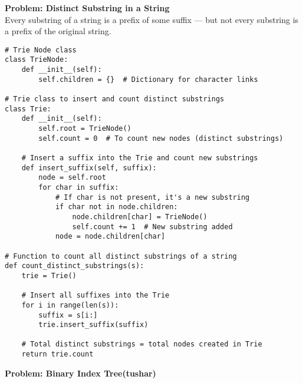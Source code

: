 \noindent\textbf{Problem: Distinct Substring in a String}\\
Every substring of a string is a prefix of some suffix — but not every substring is a prefix of the original string.
\begin{verbatim}
# Trie Node class
class TrieNode:
    def __init__(self):
        self.children = {}  # Dictionary for character links

# Trie class to insert and count distinct substrings
class Trie:
    def __init__(self):
        self.root = TrieNode()
        self.count = 0  # To count new nodes (distinct substrings)

    # Insert a suffix into the Trie and count new substrings
    def insert_suffix(self, suffix):
        node = self.root
        for char in suffix:
            # If char is not present, it's a new substring
            if char not in node.children:
                node.children[char] = TrieNode()
                self.count += 1  # New substring added
            node = node.children[char]

# Function to count all distinct substrings of a string
def count_distinct_substrings(s):
    trie = Trie()

    # Insert all suffixes into the Trie
    for i in range(len(s)):
        suffix = s[i:]
        trie.insert_suffix(suffix)

    # Total distinct substrings = total nodes created in Trie
    return trie.count
\end{verbatim}
\noindent\textbf{Problem: Binary Index Tree(tushar)}
\begin{verbatim}

\end{verbatim}
% 
